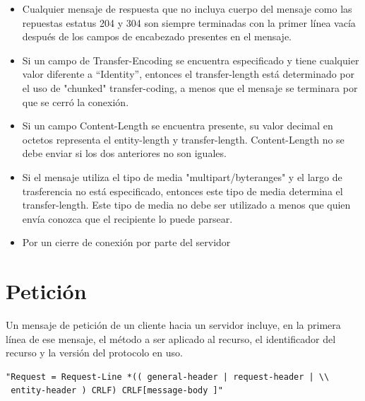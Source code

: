 \begin{description}
\begin{itemize}
\item Cualquier mensaje de respuesta que no incluya cuerpo del mensaje como las repuestas estatus 204 y 304 son siempre terminadas con la primer línea vacía después de los campos de encabezado presentes en el mensaje.
\item Si un campo de Transfer-Encoding se encuentra especificado y tiene cualquier valor diferente a “Identity”, entonces el transfer-length está determinado por el uso de "chunked" transfer-coding, a menos que el mensaje se terminara por que se cerró la conexión.
\item Si un campo Content-Length se encuentra presente, su valor decimal en octetos representa el entity-length y transfer-length. Content-Length no se debe enviar si los dos anteriores no son iguales. 
\item Si el mensaje utiliza el tipo de media "multipart/byteranges" y el largo de trasferencia no está especificado, entonces este tipo de media determina el transfer-length. Este tipo de media no debe ser utilizado a menos que quien envía conozca que el recipiente lo puede parsear.
\item Por un cierre de conexión por parte del servidor

\end{itemize}


\end{description}

\section{Petición}
Un mensaje de petición de un cliente hacia un servidor incluye, en la primera línea de ese mensaje, el método a ser aplicado al recurso, el identificador del recurso y la versión del protocolo en uso.

\begin{verbatim}
"Request = Request-Line *(( general-header | request-header | \\
 entity-header ) CRLF) CRLF[message-body ]"
\end{verbatim}

